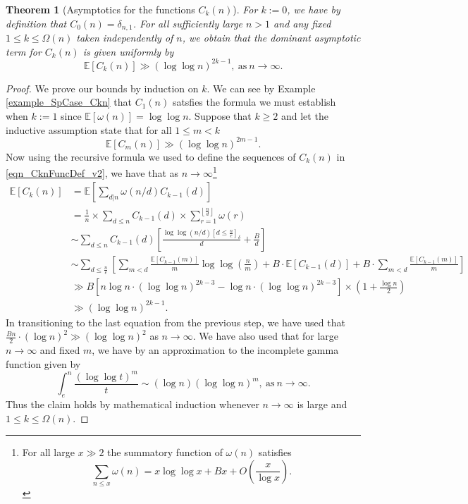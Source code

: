 \documentclass[11pt,reqno,a4letter]{article}
\numberwithin{figure}{section}
\numberwithin{table}{section}
\newcommand{\Iverson}[1]{\ensuremath{\left[#1\right]_{\delta}}}
\newcommand{\Floor}[2]{\ensuremath{\left\lfloor \frac{#1}{#2} \right\rfloor}}
\theoremstyle{plain}
\newtheorem{theorem}{Theorem}
\numberwithin{theorem}{section}
\theoremstyle{definition}
\newcommand{\NBRef}[1]{}
\begin{document}
\begin{theorem}[Asymptotics for the functions $C_k(n)$] 
\label{theorem_Ckn_GeneralAsymptoticsForms} 
For $k := 0$, we have by definition that $C_0(n) = \delta_{n,1}$. 
For all sufficiently large $n > 1$ and any fixed $1 \leq k \leq \Omega(n)$ 
taken independently of $n$, 
we obtain that the dominant asymptotic term for $C_k(n)$ is given uniformly by 
\[
\mathbb{E}[C_k(n)] \gg (\log\log n)^{2k-1}, \mathrm{\ as\ }n \rightarrow \infty. 
\]
\end{theorem} 
\NBRef{A08-2020-04-26} 
\begin{proof} 
\label{proofOf_theorem_Ckn_GeneralAsymptoticsForms} 
We prove our bounds by induction on $k$. 
We can see by Example \ref{example_SpCase_Ckn} that $C_1(n)$ 
satsfies the formula we must establish when $k := 1$ since $\mathbb{E}[\omega(n)] = \log\log n$. 
Suppose that $k \geq 2$ and let the inductive assumption state that for all $1 \leq m < k$ 
\[
\mathbb{E}[C_m(n)] \gg (\log\log n)^{2m-1}. 
\] 
Now using the recursive formula we used to define the sequences of $C_k(n)$ in 
\eqref{eqn_CknFuncDef_v2}, we have that as $n \rightarrow \infty$\footnote{ 
     For all large $x \gg 2$ the summatory function of $\omega(n)$ satisfies 
     \cite[\S 22.10]{HARDYWRIGHT} 
     \[
     \sum_{n \leq x} \omega(n) = x \log\log x + Bx + O\left(\frac{x}{\log x}\right). 
     \]
}
\begin{align*} 
\mathbb{E}[C_k(n)] & = \mathbb{E}\left[\sum_{d|n} \omega(n/d) C_{k-1}(d)\right] \\ 
     & = \frac{1}{n} \times \sum_{d \leq n} C_{k-1}(d) \times \sum_{r=1}^{\Floor{n}{d}} \omega(r) \\ 
     & \sim \sum_{d \leq n} C_{k-1}(d) \left[ 
     \frac{\log\log(n/d) \Iverson{d \leq \frac{n}{e}}}{d} + \frac{B}{d}\right] \\ 
     & \sim \sum_{d \leq \frac{n}{e}} \left[ 
     \sum_{m < d} \frac{\mathbb{E}[C_{k-1}(m)]}{m} \log\log\left(\frac{n}{m}\right) + 
     B \cdot \mathbb{E}[C_{k-1}(d)] + B \cdot \sum_{m < d} \frac{\mathbb{E}[C_{k-1}(m)]}{m} 
     \right] \\ 
     & \gg B \left[n \log n \cdot (\log\log n)^{2k-3} - \log n \cdot (\log\log n)^{2k-3}\right] \times 
     \left(1 + \frac{\log n}{2}\right) \\ 
     & \gg (\log\log n)^{2k-1}. 
\end{align*} 
In transitioning to the last equation from the previous step, we have used that 
$\frac{Bn}{2} \cdot (\log n)^2 \gg (\log\log n)^2$ as $n \rightarrow \infty$. We have also used that for large 
$n \rightarrow \infty$ and fixed $m$, we have by an approximation to the incomplete gamma function given by 
\[
\int_{e}^{n} \frac{(\log\log t)^m}{t} \sim (\log n) (\log\log n)^{m}, 
     \mathrm{\ as\ } n \rightarrow \infty. 
\]
Thus the claim holds by mathematical induction whenever $n \rightarrow \infty$ is large and 
$1 \leq k \leq \Omega(n)$. 
\end{proof} 
\end{document}
